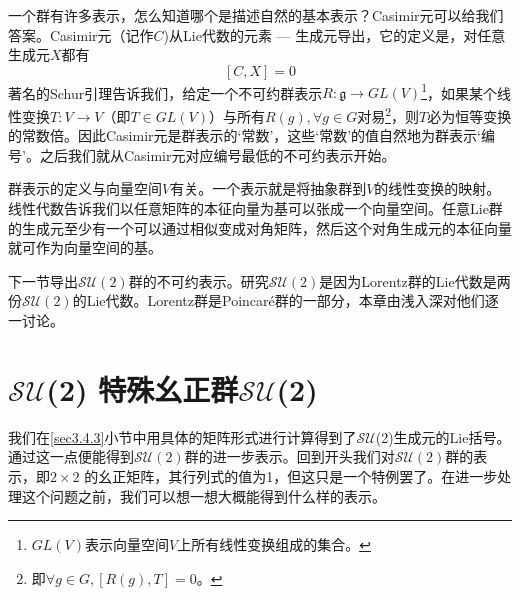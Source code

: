 一个群有许多表示，怎么知道哪个是描述自然的基本表示？Casimir元可以给我们答案。Casimir元（记作$C$)从Lie代数的元素 --- 生成元导出，它的定义是，对任意生成元$X$都有
\begin{equation}
\label{equ3.93}
[C, X] = 0
\end{equation}
著名的Schur引理告诉我们，给定一个不可约群表示$R: \mathfrak{g} \rightarrow GL(V)$\footnote{$GL(V)$表示向量空间$V$上所有线性变换组成的集合。}，如果某个线性变换$T: V \rightarrow V$（即$T \in GL(V)$）与所有$R(g), \forall g \in G$对易\footnote{即$\forall g \in G, [R(g), T] = 0$。}，则$T$必为恒等变换的常数倍。因此Casimir元是群表示的‘常数’，这些‘常数’的值自然地为群表示‘编号’。之后我们就从Casimir元对应编号最低的不可约表示开始。

群表示的定义与向量空间$V$有关。一个表示就是将抽象群到$V$的线性变换的映射。线性代数告诉我们以任意矩阵的本征向量为基可以张成一个向量空间。任意Lie群的生成元至少有一个可以通过相似变成对角矩阵，然后这个对角生成元的本征向量就可作为向量空间的基。

下一节导出$\mathcal{SU}(2)$群的不可约表示。研究$\mathcal{SU}(2)$是因为Lorentz群的Lie代数是两份$\mathcal{SU}(2)$的Lie代数。Lorentz群是Poincar\'e群的一部分，本章由浅入深对他们逐一讨论。




\section[$\mathcal{SU}$(2)]{$\mathcal{SU}$(2)  特殊幺正群$\mathcal{SU}$(2)}\label{sec3.6}

我们在\ref{sec3.4.3}小节中用具体的矩阵形式进行计算得到了$\mathcal{SU}$(2)生成元的Lie括号。通过这一点便能得到$\mathcal{SU}(2)$群的进一步表示。回到开头我们对$\mathcal{SU}(2)$群的表示，即$2\times 2$ 的幺正矩阵，其行列式的值为1，但这只是一个特例罢了。在进一步处理这个问题之前，我们可以想一想大概能得到什么样的表示。

